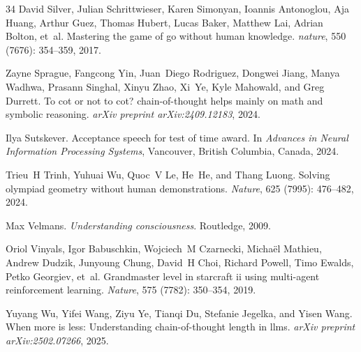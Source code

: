 \begin{thebibliography}{34}
David Silver, Julian Schrittwieser, Karen Simonyan, Ioannis Antonoglou, Aja Huang, Arthur Guez, Thomas Hubert, Lucas Baker, Matthew Lai, Adrian Bolton, et~al.
\newblock Mastering the game of go without human knowledge.
\newblock \emph{nature}, 550 (7676): 354--359, 2017.

Zayne Sprague, Fangcong Yin, Juan~Diego Rodriguez, Dongwei Jiang, Manya Wadhwa, Prasann Singhal, Xinyu Zhao, Xi~Ye, Kyle Mahowald, and Greg Durrett.
\newblock To cot or not to cot? chain-of-thought helps mainly on math and symbolic reasoning.
\newblock \emph{arXiv preprint arXiv:2409.12183}, 2024.

Ilya Sutskever.
\newblock Acceptance speech for test of time award.
\newblock In \emph{Advances in Neural Information Processing Systems}, Vancouver, British Columbia, Canada, 2024.

Trieu~H Trinh, Yuhuai Wu, Quoc~V Le, He~He, and Thang Luong.
\newblock Solving olympiad geometry without human demonstrations.
\newblock \emph{Nature}, 625 (7995): 476--482, 2024.

Max Velmans.
\newblock \emph{Understanding consciousness}.
\newblock Routledge, 2009.

Oriol Vinyals, Igor Babuschkin, Wojciech~M Czarnecki, Micha{\"e}l Mathieu, Andrew Dudzik, Junyoung Chung, David~H Choi, Richard Powell, Timo Ewalds, Petko Georgiev, et~al.
\newblock Grandmaster level in starcraft ii using multi-agent reinforcement learning.
\newblock \emph{Nature}, 575 (7782): 350--354, 2019.

Yuyang Wu, Yifei Wang, Ziyu Ye, Tianqi Du, Stefanie Jegelka, and Yisen Wang.
\newblock When more is less: Understanding chain-of-thought length in llms.
\newblock \emph{arXiv preprint arXiv:2502.07266}, 2025.

\end{thebibliography}
